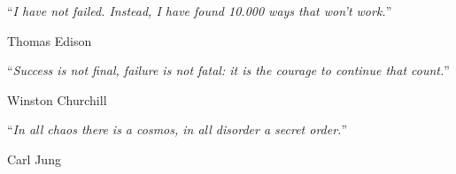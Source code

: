 \vspace*{0.2\textheight}

\noindent\enquote{\itshape I have not failed. Instead, I have found 10.000 ways that won't work.}\bigbreak

\hfill Thomas Edison

\noindent\enquote{\itshape Success is not final, failure is not fatal: it is the courage to continue that count.}\bigbreak

\hfill Winston Churchill

\noindent\enquote{\itshape In all chaos there is a cosmos, in all disorder a secret order.}\bigbreak

\hfill Carl Jung